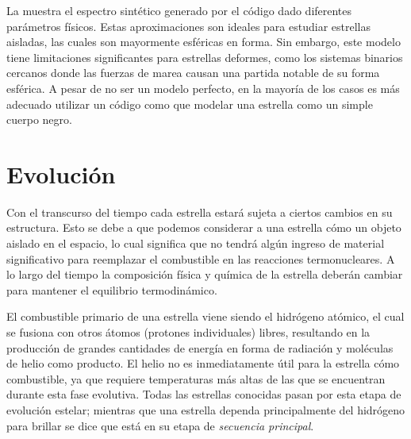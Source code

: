 La  muestra el espectro sintético generado por
el código  dado diferentes parámetros físicos. Estas aproximaciones
son ideales para estudiar estrellas aisladas, las cuales son mayormente
esféricas en forma. Sin embargo, este modelo tiene limitaciones significantes
para estrellas deformes, como los sistemas binarios cercanos donde las fuerzas
de marea causan una partida notable de su forma esférica. A pesar de no ser un
modelo perfecto, en la mayoría de los casos es más adecuado utilizar un código
como  que modelar una estrella como un simple cuerpo negro.

\section{Evolución}

Con el transcurso del tiempo cada estrella estará sujeta a ciertos cambios en su
estructura. Esto se debe a que podemos considerar a una estrella cómo un objeto
aislado en el espacio, lo cual significa que no tendrá algún ingreso de material
significativo para reemplazar el combustible  en las reacciones
termonucleares. A lo largo del tiempo la composición física y química de la
estrella deberán cambiar para mantener el equilibrio termodinámico.

El combustible primario de una estrella viene siendo el hidrógeno atómico, el
cual se fusiona con otros átomos (protones individuales) libres, resultando en
la producción de grandes cantidades de energía en forma de radiación y moléculas
de helio como producto. El helio no es inmediatamente útil para la estrella cómo
combustible, ya que requiere temperaturas más altas de las que se encuentran
durante esta fase evolutiva. Todas las estrellas conocidas pasan por esta etapa
de evolución estelar; mientras que una estrella dependa principalmente del
hidrógeno para brillar se dice que está en su etapa de \textit{secuencia
principal}. 

